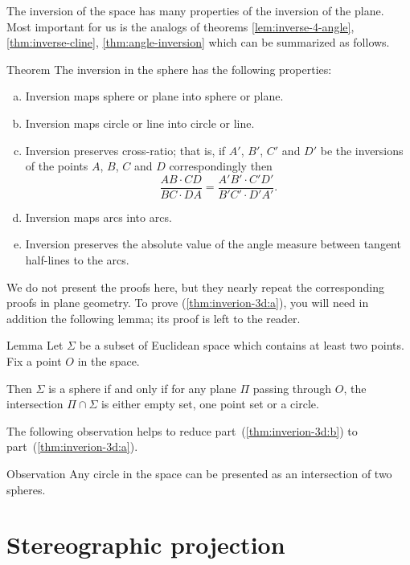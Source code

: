 The inversion of the space 
has many properties 
of the inversion of the plane.
Most important for us is the analogs of theorems \ref{lem:inverse-4-angle}, \ref{thm:inverse-cline}, \ref{thm:angle-inversion} which can be summarized as follows.

\begin{thm}{Theorem}\label{thm:inverion-3d}
The inversion in the sphere has the following properties:
\begin{enumerate}[(a)]
\item\label{thm:inverion-3d:a} Inversion maps sphere or plane into sphere or plane.
\item\label{thm:inverion-3d:b} Inversion maps circle or line into circle or line. 
\item\label{thm:inverion-3d:cross-ratio} Inversion preserves cross-ratio; that is, if $A'$, $B'$, $C'$ and $D'$ be the inversions of the points $A$, $B$, $C$ and $D$ correspondingly 
then
$$\frac{AB\cdot CD}{BC\cdot DA}= \frac{A'B'\cdot C'D'}{B'C'\cdot D'A'}.$$
\item Inversion maps arcs into arcs.
\item\label{thm:inverion-3d:angle} Inversion preserves the absolute value of the angle
measure between tangent half-lines to the arcs.
\end{enumerate}
\end{thm}


We do not present the proofs here, but
they nearly repeat the corresponding proofs in plane geometry.
To prove (\ref{thm:inverion-3d:a}), you will need in addition the following lemma;
its proof is left to the reader.

\begin{thm}{Lemma}
Let $\Sigma$ be a subset of Euclidean space
which contains at least two points.
Fix a point $O$ in the space.

Then $\Sigma$ is 
a sphere 
if and only if
for any plane $\Pi$ passing through $O$,
the intersection $\Pi\cap \Sigma$ is either empty set,
one point set or a circle.
\end{thm}  

The following observation helps to reduce part~(\ref{thm:inverion-3d:b}) to part~(\ref{thm:inverion-3d:a}).

\begin{thm}{Observation}
Any circle in the space can be presented as an intersection of two spheres.
\end{thm}


\section*{Stereographic projection}

